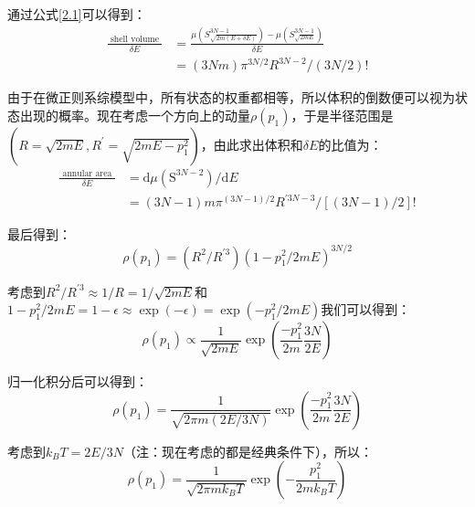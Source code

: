 \documentclass[UTF8]{ctexart}
\begin{document}
	通过公式\ref{2.1}可以得到：
	\begin{equation}
	\begin{aligned}
	\frac{\text { shell volume }}{\delta E}&=\frac{\mu\left(S_{\sqrt{2 m(E+\delta E)}}^{3 N-1}\right)-\mu\left(S_{\sqrt{2 m E}}^{3 N-1}\right)}{\delta E}\\
	&=(3 N m) \pi^{3 N / 2} R^{3 N-2} /(3 N / 2) !
	\end{aligned}
	\end{equation}
	
	
	由于在微正则系综模型中，所有状态的权重都相等，所以体积的倒数便可以视为状态出现的概率。现在考虑一个方向上的动量$\rho(p_{1})$，于是半径范围是$(R=\sqrt{2 m E},R^{\prime}=\sqrt{2 m E-p_{1}^{2}})$，由此求出体积和$\delta E$的比值为：
	\begin{equation}
	\begin{aligned}
	\frac{\text { annular area }}{\delta E}&=\mathrm{d} \mu\left(\mathrm{S}^{3 N-2}\right) / \mathrm{d} E\\
	&=(3 N-1) m \pi^{(3 N-1) / 2} R^{\prime 3 N-3} /[(3 N-1) / 2] !
	\end{aligned}
	\end{equation}
	
	最后得到：
	\begin{equation}
		\rho(p_{1})=\left(R^{2} / R^{\prime 3}\right)\left(1-p_{1}^{2} / 2 m E\right)^{3 N / 2}
	\end{equation}
	
	\noindent 考虑到$R^{2} / R^{\prime 3} \approx 1 / R=1 / \sqrt{2 m E}$和$1-p_{1}^{2} / 2 m E=1-\epsilon \approx\exp (-\epsilon)=\exp \left(-p_{1}^{2} / 2 m E\right)$我们可以得到：
	\begin{equation}
	\rho\left(p_{1}\right) \propto \frac{1}{\sqrt{2 m E}} \exp \left(\frac{-p_{1}^{2}}{2 m} \frac{3 N}{2 E}\right)
	\end{equation}
	
	归一化积分后可以得到：
	\begin{equation}
	\rho\left(p_{1}\right)=\frac{1}{\sqrt{2 \pi m(2 E / 3 N)}} \exp \left(\frac{-p_{1}^{2}}{2 m} \frac{3 N}{2 E}\right)
	\end{equation}
	
	考虑到$k_{B} T=2 E / 3 N$（注：现在考虑的都是经典条件下），所以：
	\begin{equation}
	\rho\left(p_{1}\right)=\frac{1}{\sqrt{2 \pi m k_{B} T}} \exp \left(-\frac{p_{1}^{2}}{2 m k_{B} T}\right)\label{equ_micro_rho}
	\end{equation}
	
\end{document}
